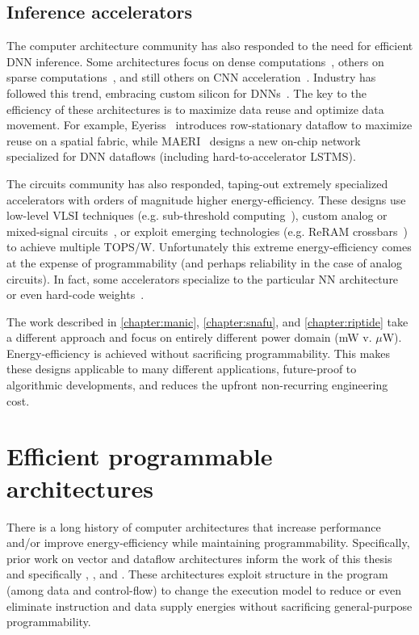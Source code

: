 \subsection{Inference accelerators}
The computer architecture community has also responded to the need for efficient DNN inference.
% 
Some architectures focus on dense computations~\cite{chen:isca16:eyeriss,
chen:asplos14:diannao, chen2014dadiannao}, others on sparse
computations~\cite{han:isca16:eie, du:isca15:shidiannao, maeri,
zhang2016cambricon}, and still others on CNN
acceleration~\cite{alwani2016fused,parashar:isca17:scnn, albericio2016cnvlutin, ding2017circnn, ren2017sc, song2018insitu}.  
%
Industry has followed this trend, embracing custom silicon for
DNNs~\cite{jouppi:isca17:tpu}.
% 
The key to the efficiency of these architectures is to maximize data reuse and
optimize data movement.
% 
For example, Eyeriss~\cite{chen:isca16:eyeriss} introduces row-stationary dataflow to maximize reuse on a spatial fabric, while MAERI~\cite{maeri} designs a new on-chip network specialized for DNN dataflows (including hard-to-accelerator LSTMS).

The circuits community has also responded, taping-out extremely specialized accelerators with orders of magnitude higher energy-efficiency.
%
These designs use low-level VLSI techniques (e.g. sub-threshold computing~\cite{fick2017subthresholdinference}), custom analog or mixed-signal circuits~\cite{bankman2018always}, or exploit emerging technologies (e.g. ReRAM crossbars~\cite{xue201924,xue202015}) to achieve multiple TOPS/W.
% 
Unfortunately this extreme energy-efficiency comes at the expense of programmability (and perhaps reliability in the case of analog circuits).
% 
In fact, some accelerators specialize to the particular NN architecture~\cite{bankman2018always} or even hard-code weights~\cite{something}.

The work described in \autoref{chapter:manic}, \autoref{chapter:snafu}, and \autoref{chapter:riptide} take a different approach and focus on entirely different power domain (mW v. $\mu$W).
% 
Energy-efficiency is achieved without sacrificing programmability.
% 
This makes these designs applicable to many different applications, future-proof to algorithmic developments, and reduces the upfront non-recurring engineering cost.

\section{Efficient programmable architectures}
There is a long history of computer architectures that increase performance and/or improve energy-efficiency while maintaining programmability.
% 
Specifically, prior work on vector and dataflow architectures inform the work of this thesis and specifically \manic, \snafu, and \riptide.
% 
% 
These architectures exploit structure in the program (among data and control-flow) to change the execution model to reduce or even eliminate instruction and data supply energies without sacrificing general-purpose programmability.

